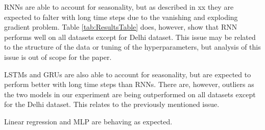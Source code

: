 RNNs are able to account for seasonality, but as described in xx they are expected to falter with long time steps due to the vanishing and exploding gradient problem. Table \ref{tab:ResultsTable} does, however, show that RNN performs well on all datasets except for Delhi dataset. This issue may be related to the structure of the data or tuning of the hyperparameters, but analysis of this issue is out of scope for the paper.
 
LSTMs and GRUs are also able to account for seasonality, but are expected to perform better with long time steps than RNNs. There are, however, outliers as the two models in our experiment are being outperformed on all datasets except for the Delhi dataset. This relates to the previously mentioned issue.

Linear regression and MLP are behaving as expected.